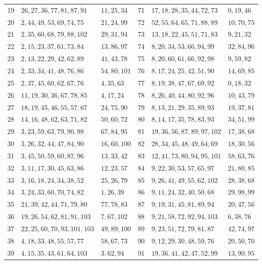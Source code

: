 \documentclass[11pt]{amsart}
\theoremstyle{remark}
\begin{document}
\begin{center}
\begin{tabular}{rll@{\quad}rll}
19 & $26,27,36,77,81,87,91$ & $11,25,34$ & 71 & $17,18,28,35,44,72,73$ & $0,19,46$ \\
20 & $2,44,49,53,69,74,75$ & $21,24,99$ & 72 & $52,55,64,65,71,88,89$ & $10,70,75$ \\
21 & $2,35,60,68,79,88,102$ & $29,31,94$ & 73 & $13,18,22,45,51,71,83$ & $9,21,32$ \\
22 & $2,15,23,37,61,73,84$ & $13,86,97$ & 74 & $8,20,34,53,66,94,99$ & $32,84,96$ \\
23 & $2,13,22,29,42,62,89$ & $41,43,78$ & 75 & $8,20,60,61,66,92,98$ & $9,59,82$ \\
24 & $2,33,34,41,48,76,86$ & $54,80,101$ & 76 & $8,17,24,25,42,51,90$ & $14,69,85$ \\
25 & $2,37,45,60,62,67,76$ & $4,35,63$ & 77 & $8,19,38,47,67,69,92$ & $0,18,32$ \\
26 & $11,19,30,36,67,78,85$ & $4,17,24$ & 78 & $8,26,40,44,80,92,96$ & $10,43,79$ \\
27 & $18,19,45,46,55,57,67$ & $24,75,90$ & 79 & $8,13,21,29,35,89,93$ & $19,37,81$ \\
28 & $14,16,48,62,63,71,82$ & $50,60,72$ & 80 & $8,14,17,35,78,83,93$ & $34,51,99$ \\
29 & $3,23,59,63,79,90,98$ & $67,84,95$ & 81 & $19,36,56,87,89,97,102$ & $17,38,68$ \\
30 & $3,26,32,44,47,84,90$ & $16,60,100$ & 82 & $28,34,45,48,49,64,69$ & $18,30,56$ \\
31 & $3,45,50,59,60,87,96$ & $13,33,42$ & 83 & $12,41,73,80,94,95,101$ & $58,63,76$ \\
32 & $3,11,17,30,45,63,86$ & $12,23,57$ & 84 & $9,22,30,53,57,65,97$ & $21,80,85$ \\
33 & $3,16,18,24,34,38,52$ & $25,26,79$ & 85 & $9,26,41,49,55,62,102$ & $28,38,68$ \\
34 & $3,24,33,60,70,74,82$ & $1,26,39$ & 86 & $9,11,24,32,40,50,68$ & $29,98,99$ \\
35 & $21,39,42,44,71,79,80$ & $77,78,83$ & 87 & $9,19,31,45,81,89,94$ & $20,47,56$ \\
36 & $19,26,54,62,81,91,103$ & $7,67,102$ & 88 & $9,21,58,72,92,94,103$ & $6,38,76$ \\
37 & $22,25,60,70,93,101,103$ & $49,89,100$ & 89 & $9,23,51,72,79,81,87$ & $42,74,97$ \\
38 & $4,18,33,48,55,57,77$ & $58,67,73$ & 90 & $9,12,29,30,48,59,76$ & $20,50,70$ \\
39 & $4,15,35,43,61,64,103$ & $3,62,94$ & 91 & $19,36,41,42,47,52,99$ & $13,90,95$ \\

\end{tabular}
\end{center}
\end{document}
